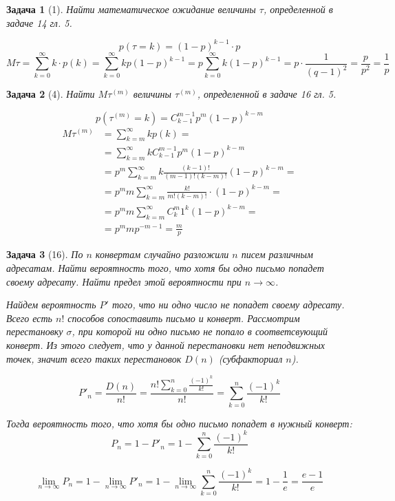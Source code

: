 \documentclass{article}
\theoremstyle{problemstyle}
\newtheorem{problem}{Задача}[section]
\begin{document}
\begin{problem}[1]
    Найти математическое ожидание величины $\tau$, определенной в задаче
    14 гл. 5.

    \[ p(\tau = k) = (1-p)^{k-1} \cdot p \]
    \[
        M \tau =
        \sum_{k=0}^\infty k \cdot p(k) =
        \sum_{k=0}^\infty k p (1-p)^{k-1} =
        p \sum_{k=0}^\infty k (1-p)^{k-1} =
        p \cdot \frac{1}{(q-1)^2} =
        \frac{p}{p^2} =
        \frac{1}{p}
    \]
\end{problem}

\begin{problem}[4]
    Найти $M \tau^{(m)}$ величины $\tau^{(m)}$, определенной в задаче 16 гл. 5.

    \[ p(\tau^{(m)} = k) = C_{k-1}^{m-1} p^m (1-p)^{k-m} \]
    \begin{align*}
        M \tau^{(m)} &= 
        \sum_{k=m}^\infty k p(k) = \\
                     &= \sum_{k=m}^\infty k C_{k-1}^{m-1} p^m (1-p)^{k-m} \\
                     &= p^m \sum_{k=m}^\infty k \frac{(k-1)!}{(m-1)!(k-m)!} (1-p)^{k-m} =  \\
                     &= p^m m \sum_{k=m}^\infty \frac{k!}{m! (k-m)!} \cdot (1-p)^{k-m}  =  \\
                     &= p^m m \sum_{k=m}^\infty C_k^m 1^k (1-p)^{k-m} = \\
                     &= p^m m p^{-m-1} = \frac{m}{p}
    \end{align*}
\end{problem}

\begin{problem}[16]
    По $n$ конвертам случайно разложили $n$ писем различным адресатам.
    Найти вероятность того, что хотя бы одно письмо попадет своему адресату.
    Найти предел этой вероятности при $n \to \infty$.

    Найдем вероятность $P'$ того, что ни одно число не попадет своему адресату.
    Всего есть $n!$ способов сопоставить письмо и конверт.
    Рассмотрим перестановку $\sigma$, при которой ни одно письмо не 
    попало в соответсвующий конверт. Из этого следует, что
    у данной перестановки нет неподвижных точек,
    значит всего таких перестановок $D(n)$ (субфакториал $n$).

    \[
        P'_n =
        \frac{D(n)}{n!} =
        \frac{n! \sum_{k=0}^n \frac{(-1)^k}{k!}}{n!} =
        \sum_{k=0}^n \frac{(-1)^k}{k!}
    \]

    Тогда вероятность того, что хотя бы одно письмо попадет в нужный конверт:
    \[
        P_n =
        1 - P'_n =
        1 - \sum_{k=0}^n \frac{(-1)^k}{k!}
    \]

    \[
        \lim_{n \to \infty} P_n =
        1 - \lim_{n \to \infty} P'_n =
        1 - \lim_{n \to \infty} \sum_{k=0}^n \frac{(-1)^k}{k!} =
        1 - \frac{1}{e} =
        \frac{e-1}{e}
    \]
\end{problem}
\end{document}
